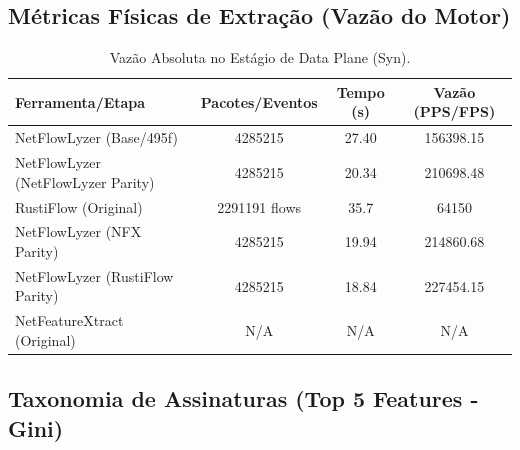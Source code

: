 \documentclass[11pt,a4paper]{article}
\begin{document}
\subsection{Métricas Físicas de Extração (Vazão do Motor)}
\begin{table}[H]
\centering
\begin{threeparttable}
\begin{tabular}{lccc}
\toprule
\textbf{Ferramenta/Etapa} & \textbf{Pacotes/Eventos} & \textbf{Tempo (s)} & \textbf{Vazão (PPS/FPS)} \\
\midrule
NetFlowLyzer (Base/495f) & 4285215 & 27.40 & 156398.15 \\
NetFlowLyzer (NetFlowLyzer Parity) & 4285215 & 20.34 & 210698.48 \\
RustiFlow (Original) & 2291191 flows & 35.7 & 64150 \\
NetFlowLyzer (NFX Parity) & 4285215 & 19.94 & 214860.68 \\
NetFlowLyzer (RustiFlow Parity) & 4285215 & 18.84 & 227454.15 \\
NetFeatureXtract (Original) & N/A & N/A & N/A \\
\bottomrule
\end{tabular}
\end{threeparttable}
\caption{Vazão Absoluta no Estágio de Data Plane (Syn).}
\end{table}

\subsection{Taxonomia de Assinaturas (Top 5 Features - Gini)}
\begin{table}[H]
\centering
{}
\caption{Principais atributos de correlação estocástica por limiar dimensional (Syn).}
\end{table}
\end{document}
